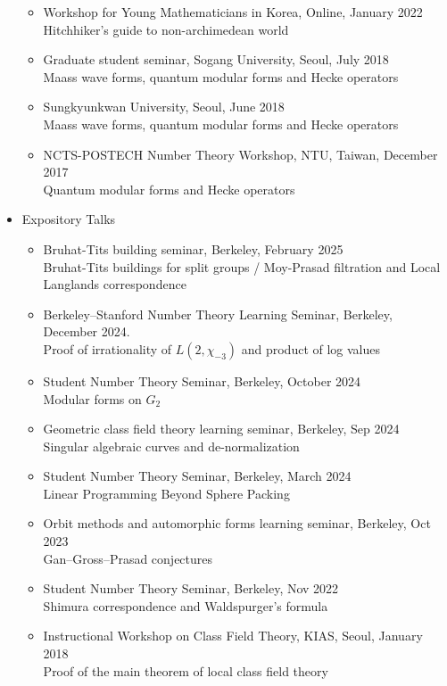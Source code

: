 \documentclass[letterpaper,11pt]{article}
\begin{document}
\begin{itemize}
\begin{itemize}
		\item Workshop for Young Mathematicians in Korea, Online, January 2022 \\
		Hitchhiker's guide to non-archimedean world
		\item Graduate student seminar, Sogang University, Seoul, July 2018 \\
		Maass wave forms, quantum modular forms and Hecke operators
		\item Sungkyunkwan University, Seoul, June 2018 \\
		Maass wave forms, quantum modular forms and Hecke operators
		\item NCTS-POSTECH Number Theory Workshop, NTU, Taiwan, December 2017 \\ 
		Quantum modular forms and Hecke operators
	\end{itemize}
	\item Expository Talks
	\begin{itemize}
		\item Bruhat-Tits building seminar, Berkeley, February 2025 \\
		Bruhat-Tits buildings for split groups / Moy-Prasad filtration and Local Langlands correspondence
		\item Berkeley--Stanford Number Theory Learning Seminar, Berkeley, December 2024.\\
		Proof of irrationality of $L(2, \chi_{-3})$ and product of log values
		\item Student Number Theory Seminar, Berkeley, October 2024 \\
		Modular forms on $G_2$
		\item Geometric class field theory learning seminar, Berkeley, Sep 2024 \\
		Singular algebraic curves and de-normalization
		\item Student Number Theory Seminar, Berkeley, March 2024 \\
		Linear Programming Beyond Sphere Packing
		\item Orbit methods and automorphic forms learning seminar, Berkeley, Oct 2023 \\
		Gan--Gross--Prasad conjectures
		\item Student Number Theory Seminar, Berkeley, Nov 2022 \\
		Shimura correspondence and Waldspurger's formula
		\item Instructional Workshop on Class Field Theory, KIAS, Seoul, January 2018 \\
		Proof of the main theorem of local class field theory
	\end{itemize}
\end{itemize}
\end{document}
